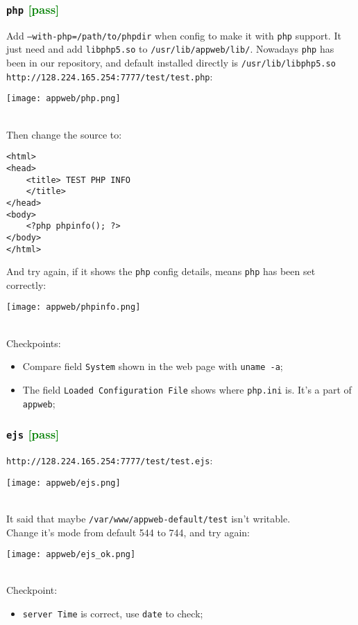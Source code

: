 \documentclass[a4paper]{report}
\begin{document}
\subsubsection{{\tt php} \textcolor{green}{[pass]}}
Add {\tt --with-php=/path/to/phpdir} when config to make it with {\tt php} support.
It just need and add {\tt libphp5.so} to {\tt /usr/lib/appweb/lib/}. Nowadays {\tt php}
has been in our repository, and default installed directly is {\tt /usr/lib/libphp5.so}
{\tt http://128.224.165.254:7777/test/test.php}:
\\[\intextsep]
\begin{minipage}{\textwidth}
\centering
\texttt{[image: appweb/php.png]}
\end{minipage}
\\[\intextsep]
Then change the source to:
\begin{lstlisting}
<html>
<head>
    <title> TEST PHP INFO
    </title>
</head>
<body>
    <?php phpinfo(); ?>
</body>
</html>
\end{lstlisting}
And try again, if it shows the {\tt php} config details, means {\tt php} has been set correctly:
\\[\intextsep]
\begin{minipage}{\textwidth}
\left
\texttt{[image: appweb/phpinfo.png]}
\end{minipage}
\\[\intextsep]
Checkpoints:
\begin{itemize}
    \item Compare field {\tt System} shown in the web page with {\tt uname -a};
    \item The field {\tt Loaded Configuration File} shows where {\tt php.ini} 
          is. It's a part of {\tt appweb};
\end{itemize}
\subsubsection{{\tt ejs} \textcolor{green}{[pass]}}
{\tt http://128.224.165.254:7777/test/test.ejs}:
\\[\intextsep]
\begin{minipage}{\textwidth}
\centering
\texttt{[image: appweb/ejs.png]}
\end{minipage}
\\[\intextsep]
It said that maybe {\tt /var/www/appweb-default/test} isn't writable.\\
Change it's mode from default 544 to 744, and try again:
\\[\intextsep]
\begin{minipage}{\textwidth}
\centering
\texttt{[image: appweb/ejs\_ok.png]}
\end{minipage}
\\[\intextsep]
Checkpoint:
\begin{itemize}
    \item {\tt server Time} is correct, use {\tt date} to check;
\end{itemize}
\end{document}
